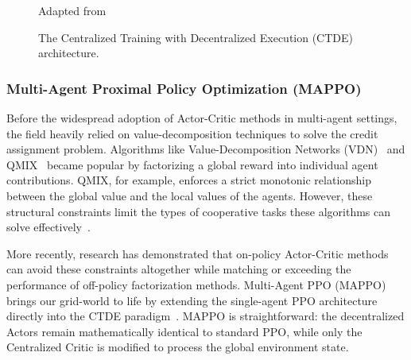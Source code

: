 \begin{figure}[H]
\vspace{1ex}
{\raggedleft \footnotesize Adapted from \parencite{Yu_Velu_Vinitsky_Gao_Wang_Bayen_Wu_2022} \par}
\caption{The Centralized Training with Decentralized Execution (CTDE) architecture.}
\label{fig:ctde_mappo}
\end{figure}

\subsubsection{Multi-Agent Proximal Policy Optimization (MAPPO)}
\label{subsec:mappo}

Before the widespread adoption of Actor-Critic methods in multi-agent settings, the field heavily relied on value-decomposition techniques to solve the credit assignment problem. Algorithms like Value-Decomposition Networks (VDN)~\parencite{Sunehag_Lever_Gruslys_Czarnecki_Zambaldi_Jaderberg_Lanctot_Sonnerat_Leibo_Tuyls_et_al._2017} and QMIX~\parencite{Rashid_Samvelyan_Witt_Farquhar_Foerster_Whiteson_2018} became popular by factorizing a global reward into individual agent contributions. QMIX, for example, enforces a strict monotonic relationship between the global value and the local values of the agents. However, these structural constraints limit the types of cooperative tasks these algorithms can solve effectively~\parencite{Castellini_2022}.

More recently, research has demonstrated that on-policy Actor-Critic methods can avoid these constraints altogether while matching or exceeding the performance of off-policy factorization methods. Multi-Agent PPO (MAPPO) brings our grid-world to life by extending the single-agent PPO architecture directly into the CTDE paradigm~\parencite{Yu_Velu_Vinitsky_Gao_Wang_Bayen_Wu_2022}. MAPPO is straightforward: the decentralized Actors remain mathematically identical to standard PPO, while only the Centralized Critic is modified to process the global environment state.

